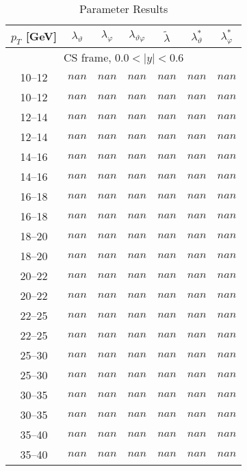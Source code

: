 \documentclass{article}
\begin{document}
\begin{table}[!h]
\centering \caption{Parameter Results}
\begin{tabular}{|c|cccccc|}
\hline
$p_{T}$ [GeV] & $\lambda_{\vartheta}$ & $\lambda_{\varphi}$ &  $\lambda_{\vartheta \varphi}$ & $\tilde{\lambda}$ & $\lambda^*_{\vartheta}$ & $\lambda^*_{\varphi}$ \\
\hline \multicolumn{7}{|c|}{CS frame, $0.0 < |y| < 0.6$}\\ \hline \rule{0pt}{4mm}
10--12   &  $nan$  & $nan$  &  $nan$ &  $nan$  & $nan$  &  $nan$ \\
10--12   &  $nan$  & $nan$  &  $nan$ &  $nan$  & $nan$  &  $nan$ \\
12--14   &  $nan$  & $nan$  &  $nan$ &  $nan$  & $nan$  &  $nan$ \\
12--14   &  $nan$  & $nan$  &  $nan$ &  $nan$  & $nan$  &  $nan$ \\
14--16   &  $nan$  & $nan$  &  $nan$ &  $nan$  & $nan$  &  $nan$ \\
14--16   &  $nan$  & $nan$  &  $nan$ &  $nan$  & $nan$  &  $nan$ \\
16--18   &  $nan$  & $nan$  &  $nan$ &  $nan$  & $nan$  &  $nan$ \\
16--18   &  $nan$  & $nan$  &  $nan$ &  $nan$  & $nan$  &  $nan$ \\
18--20   &  $nan$  & $nan$  &  $nan$ &  $nan$  & $nan$  &  $nan$ \\
18--20   &  $nan$  & $nan$  &  $nan$ &  $nan$  & $nan$  &  $nan$ \\
20--22   &  $nan$  & $nan$  &  $nan$ &  $nan$  & $nan$  &  $nan$ \\
20--22   &  $nan$  & $nan$  &  $nan$ &  $nan$  & $nan$  &  $nan$ \\
22--25   &  $nan$  & $nan$  &  $nan$ &  $nan$  & $nan$  &  $nan$ \\
22--25   &  $nan$  & $nan$  &  $nan$ &  $nan$  & $nan$  &  $nan$ \\
25--30   &  $nan$  & $nan$  &  $nan$ &  $nan$  & $nan$  &  $nan$ \\
25--30   &  $nan$  & $nan$  &  $nan$ &  $nan$  & $nan$  &  $nan$ \\
30--35   &  $nan$  & $nan$  &  $nan$ &  $nan$  & $nan$  &  $nan$ \\
30--35   &  $nan$  & $nan$  &  $nan$ &  $nan$  & $nan$  &  $nan$ \\
35--40   &  $nan$  & $nan$  &  $nan$ &  $nan$  & $nan$  &  $nan$ \\
35--40   &  $nan$  & $nan$  &  $nan$ &  $nan$  & $nan$  &  $nan$ \\

\end{tabular}
\end{table}
\end{document}

